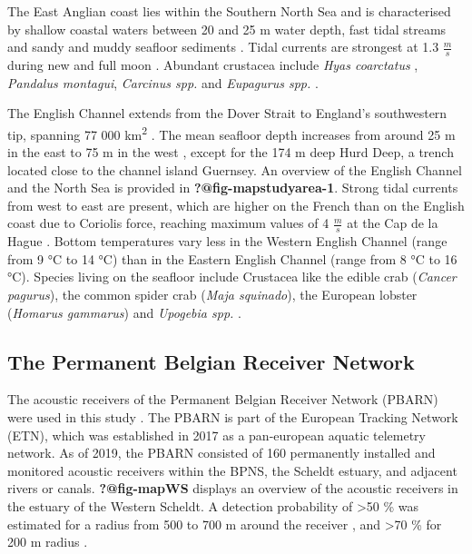 \documentclass[
  authoryear,
  review,
  3p]{elsarticle}
\begin{document}
The East Anglian coast lies within the Southern North Sea and is
characterised by shallow coastal waters between 20 and 25 m water depth,
fast tidal streams and sandy and muddy seafloor sediments
\citep{harrison_1990}. Tidal currents are strongest at 1.3
\(\frac{m}{s}\) during new and full moon \citep{arnold_1994}. Abundant
crustacea include \emph{Hyas coarctatus} \citep{dyer_1985},
\emph{Pandalus montagui}, \emph{Carcinus spp.} and \emph{Eupagurus spp.}
\citep{sergeant_1951}.

The English Channel extends from the Dover Strait to England's
southwestern tip, spanning 77 000 km\textsuperscript{2}
\citep{dauvin_2012}. The mean seafloor depth increases from around 25 m
in the east to 75 m in the west \citep{dauvin_2012}, except for the 174
m deep Hurd Deep, a trench located close to the channel island Guernsey.
An overview of the English Channel and the North Sea is provided in
\textbf{?@fig-mapstudyarea-1}. Strong tidal currents from west to east
are present, which are higher on the French than on the English coast
due to Coriolis force, reaching maximum values of 4 \(\frac{m}{s}\) at
the Cap de la Hague \citep{salomon_1993}. Bottom temperatures vary less
in the Western English Channel (range from 9 °C to 14 °C) than in the
Eastern English Channel (range from 8 °C to 16 °C). Species living on
the seafloor include Crustacea like the edible crab (\emph{Cancer
pagurus}), the common spider crab (\emph{Maja squinado}), the European
lobster (\emph{Homarus gammarus}) and \emph{Upogebia spp.}
\citep{holme_1966, vaz_2007}.

\hypertarget{the-permanent-belgian-receiver-network}{%
\subsection{The Permanent Belgian Receiver
Network}\label{the-permanent-belgian-receiver-network}}

The acoustic receivers of the Permanent Belgian Receiver Network (PBARN)
were used in this study \citep{reubens_2018}. The PBARN is part of the
European Tracking Network (ETN), which was established in 2017 as a
pan-european aquatic telemetry network. As of 2019, the PBARN consisted
of 160 permanently installed and monitored acoustic receivers within the
BPNS, the Scheldt estuary, and adjacent rivers or canals.
\textbf{?@fig-mapWS} displays an overview of the acoustic receivers in
the estuary of the Western Scheldt. A detection probability of
\textgreater50 \% was estimated for a radius from 500 to 700 m around
the receiver \citep{goossens_2022}, and \textgreater70 \% for 200 m
radius \citep{reubens_2018}.
\end{document}
